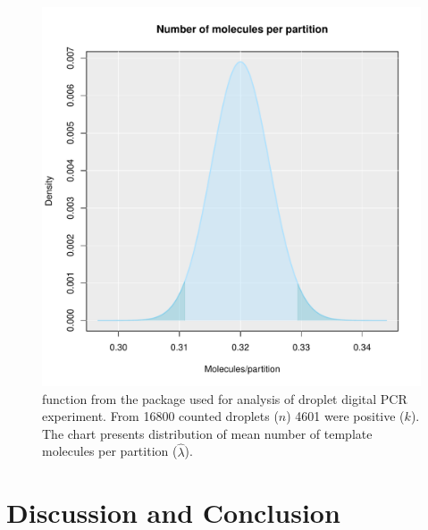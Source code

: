 \begin{figure}[htbp]
  \centering
  \includegraphics[clip=true, width=14cm]{figures/dpcR.pdf}
  \caption{ function from the  package used 
for analysis of droplet digital PCR experiment. From 16800 counted droplets 
($n$) 4601 were positive ($k$). The chart presents distribution of mean number of 
template molecules per partition ($\hat \lambda$). 
}
  \label{figure:dpcR}
\end{figure}

\section{Discussion and Conclusion}


